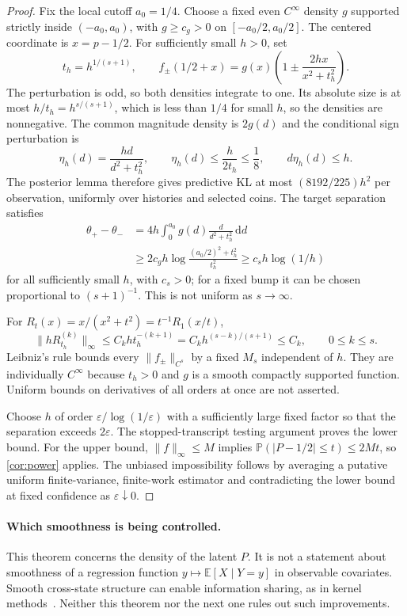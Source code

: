 \documentclass[11pt,a4paper]{article}
\theoremstyle{definition}
\newcommand{\E}{\mathbb E}
\newcommand{\Prob}{\mathbb P}
\begin{document}
\begin{proof}
Fix the local cutoff $a_0=1/4$. Choose a fixed even $C^\infty$ density $g$ supported strictly inside
$(-a_0,a_0)$, with $g\ge c_g>0$ on $[-a_0/2,a_0/2]$. The centered coordinate is
$x=p-1/2$. For sufficiently small $h>0$, set
\begin{equation}\label{eq:smooth-pair}
 t_h=h^{1/(s+1)},\qquad
 f_\pm(1/2+x)=g(x)\left(1\pm\frac{2hx}{x^2+t_h^2}\right).
\end{equation}
The perturbation is odd, so both densities integrate to one. Its absolute
size is at most $h/t_h=h^{s/(s+1)}$, which is less than $1/4$ for small
$h$, so the densities are nonnegative. The common magnitude density is
$2g(d)$ and the conditional sign perturbation is
\[
 \eta_h(d)=\frac{hd}{d^2+t_h^2},\qquad
 \eta_h(d)\le\frac{h}{2t_h}\le\frac18,\qquad d\eta_h(d)\le h.
\]
The posterior lemma therefore gives predictive KL at most
$(8192/225)h^2$ per observation, uniformly over histories and selected coins.
The target separation satisfies
\begin{align*}
 \theta_+-\theta_-
 &=4h\int_0^{a_0} g(d)\frac{d}{d^2+t_h^2}\,\mathrm dd\\
 &\ge2c_g h\log\frac{(a_0/2)^2+t_h^2}{t_h^2}
 \ge c_s h\log(1/h)
\end{align*}
for all sufficiently small $h$, with $c_s>0$; for a fixed bump it can be chosen proportional to
$(s+1)^{-1}$. This is not uniform as $s\to\infty$.

For $R_t(x)=x/(x^2+t^2)=t^{-1}R_1(x/t)$,
\[
 \|hR_{t_h}^{(k)}\|_\infty
 \le C_k h t_h^{-(k+1)}
 =C_k h^{(s-k)/(s+1)}\le C_k,\qquad 0\le k\le s.
\]
Leibniz's rule bounds every $\|f_\pm\|_{C^s}$ by a fixed $M_s$ independent
of $h$. They are individually $C^\infty$ because $t_h>0$ and $g$ is a
smooth compactly supported function. Uniform bounds on derivatives of
all orders at once are not asserted.

Choose $h$ of order $\varepsilon/\log(1/\varepsilon)$ with a sufficiently
large fixed factor so that the separation exceeds $2\varepsilon$.
The stopped-transcript testing argument proves the lower bound. For the
upper bound, $\|f\|_\infty\le M$ implies
$\Prob(|P-1/2|\le t)\le2M t$, so \cref{cor:power} applies.
The unbiased impossibility follows by averaging a putative uniform
finite-variance, finite-work estimator and contradicting the lower bound
at fixed confidence as $\varepsilon\downarrow0$.
\end{proof}

\paragraph{Which smoothness is being controlled.}
This theorem concerns the density of the latent $P$. It is not a statement
about smoothness of a regression function $y\mapsto\E[X\mid Y=y]$ in
observable covariates. Smooth cross-state structure can enable information
sharing, as in kernel methods~\cite{chen}. Neither this theorem nor the
next one rules out such improvements.
\end{document}
